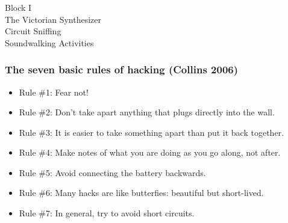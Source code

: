 \documentclass[screen, aspectratio=43]{beamer}
\begin{document}
\usebackgroundtemplate{}
\begin{frame}
\frametitle{}
{\huge Block I\\ The Victorian Synthesizer\\ Circuit Sniffing\\ Soundwalking Activities}
\end{frame}

\begin{frame}
  \frametitle{The seven basic rules of hacking (Collins 2006)}
        \begin{itemize}
	\item Rule \#1: Fear not!
	\item Rule \#2: Don't take apart anything that plugs directly into the wall.
	\item Rule \#3: It is easier to take something apart than put it back together.
	\item Rule \#4: Make notes of what you are doing as you go along, not after.
	\item Rule \#5: Avoid connecting the battery backwards.
	\item Rule \#6: Many hacks are like butterfies: beautiful but short-lived.
	\item Rule \#7: In general, try to avoid short circuits.
    \end{itemize} 
\end{frame}
%
\end{document}
